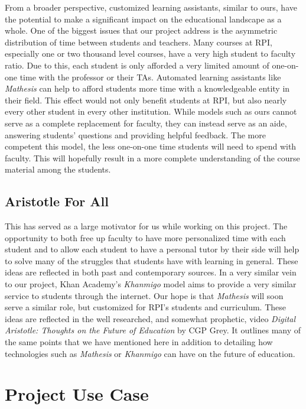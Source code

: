 \documentclass[12pt,a4paper]{article}
\begin{document}
    From a broader perspective, customized learning assistants, similar to ours, have the potential
    to make a significant impact on the educational landscape as a whole.  One of the biggest issues
    that our project address is the asymmetric distribution of time between students and teachers.
    Many courses at RPI, especially one or two thousand level courses, have a very high student to
    faculty ratio.  Due to this, each student is only afforded a very limited amount of one-on-one
    time with the professor or their TAs.  Automated learning assistants like \textit{Mathesis} can
    help to afford students more time with a knowledgeable entity in their field.  This effect would
    not only benefit students at RPI, but also nearly every other student in every other institution.
    While models such as ours cannot serve as a complete replacement for faculty, they can instead
    serve as an aide, answering students' questions and providing helpful feedback.  The more
    competent this model, the less one-on-one time students will need to spend with faculty.  This
    will hopefully result in a more complete understanding of the course material among the students.

    \subsection{Aristotle For All}

    This has served as a large motivator for us while working on this project.  The opportunity to
    both free up faculty to have more personalized time with each student and to allow each student
    to have a personal tutor by their side will help to solve many of the struggles that students
    have with learning in general.  These ideas are reflected in both past and contemporary sources.
    In a very similar vein to our project, Khan Academy's \textit{Khanmigo}\cite{khanmigo} model
    aims to provide a very similar service to students through the internet.  Our hope is that
    \textit{Mathesis} will soon serve a similar role, but customized for RPI's students and
    curriculum.  These ideas are reflected in the well researched, and somewhat prophetic, video
    \textit{Digital Aristotle: Thoughts on the Future of Education} by CGP Grey.  It outlines
    many of the same points that we have mentioned here in addition to detailing how technologies
    such as \textit{Mathesis} or \textit{Khanmigo} can have on the future of education.

    \section{Project Use Case}
\end{document}
